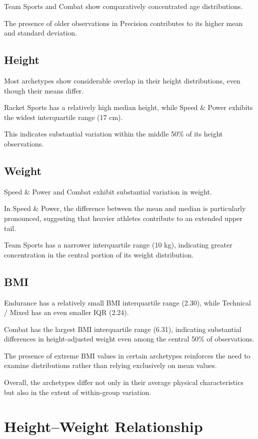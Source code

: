 \documentclass[11pt,a4paper]{article}
\begin{document}
Team Sports and Combat show comparatively
concentrated age distributions.

The presence of older observations in Precision
contributes to its higher mean and standard
deviation.


\subsection{Height}

Most archetypes show considerable overlap in
their height distributions, even though their
means differ.

Racket Sports has a relatively high median
height, while Speed \& Power exhibits the
widest interquartile range (17 cm).

This indicates substantial variation within
the middle 50\% of its height observations.


\subsection{Weight}

Speed \& Power and Combat exhibit substantial
variation in weight.

In Speed \& Power, the difference between the
mean and median is particularly pronounced,
suggesting that heavier athletes contribute
to an extended upper tail.

Team Sports has a narrower interquartile
range (10 kg), indicating greater concentration
in the central portion of its weight distribution.


\subsection{BMI}

Endurance has a relatively small BMI
interquartile range (2.30), while Technical /
Mixed has an even smaller IQR (2.24).

Combat has the largest BMI interquartile
range (6.31), indicating substantial differences
in height-adjusted weight even among the
central 50\% of observations.

The presence of extreme BMI values in certain
archetypes reinforces the need to examine
distributions rather than relying exclusively
on mean values.

Overall, the archetypes differ not only in
their average physical characteristics but
also in the extent of within-group variation.


\section{Height--Weight Relationship}
\end{document}
